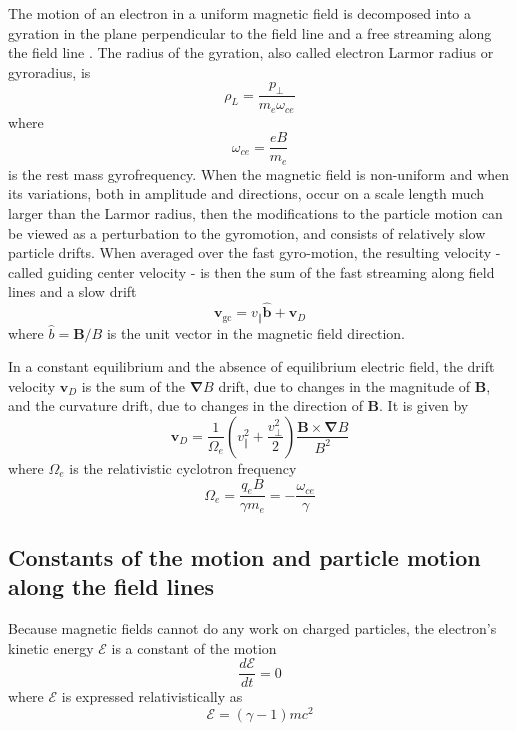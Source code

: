The motion of an electron in a uniform magnetic field is decomposed into a
gyration in the plane perpendicular to the field line and a free streaming
along the field line \cite{haz91b1}. The radius of the gyration, also called
electron Larmor radius or gyroradius, is 
\begin{equation}
\rho_{L}=\dfrac{p_{\bot}}{m_{e}\omega_{ce}}
\end{equation}
where 
\begin{equation}
\omega_{ce}=\dfrac{eB}{m_{e}}   \label{gyrorest}
\end{equation}
is the rest mass gyrofrequency. When the magnetic field is non-uniform and
when its variations, both in amplitude and directions, occur on a scale
length much larger than the Larmor radius, then the modifications to the
particle motion can be viewed as a perturbation to the gyromotion, and
consists of relatively slow particle drifts. When averaged over the fast
gyro-motion, the resulting velocity - called guiding center velocity - is
then the sum of the fast streaming along field lines and a slow drift%
\begin{equation}
\mathbf{v}_{\text{gc}}=v_{\Vert}\widehat{\mathbf{b}}+\mathbf{v}_{D} 
\label{vgc}
\end{equation}
where $\widehat{b}=\mathbf{B}/B$ is the unit vector in the magnetic field
direction.

In a constant equilibrium and the absence of equilibrium electric field, the
drift velocity $\mathbf{v}_{D}$ is the sum of the $\mathbf{\nabla}B$ drift,
due to changes in the magnitude of $\mathbf{B}$, and the curvature drift,
due to changes in the direction of $\mathbf{B}$. It is given by \cite%
{haz91b1}%
\begin{equation}
\mathbf{v}_{D}=\dfrac{1}{\Omega_{e}}\left( v_{\Vert}^{2}+\dfrac{v_{\bot}^{2}%
}{2}\right) \dfrac{\mathbf{B}\times\mathbf{\nabla}B}{B^{2}}   \label{vdrift0}
\end{equation}
where $\Omega_{e}$ is the relativistic cyclotron frequency%
\begin{equation}
\Omega_{e}=\dfrac{q_{e}B}{\gamma m_{e}}=-\dfrac{\omega_{ce}}{\gamma} 
\label{gyrofrequency}
\end{equation}

\subsection{Constants of the motion and particle motion along the field lines%
}

Because magnetic fields cannot do any work on charged particles, the
electron's kinetic energy $\mathcal{E}$ is a constant of the motion 
\begin{equation}
\dfrac{d\mathcal{E}}{dt}=0
\end{equation}
where $\mathcal{E}$ is expressed relativistically as%
\begin{equation}
\mathcal{E}=\left( \gamma-1\right) mc^{2}   \label{encons30}
\end{equation}

